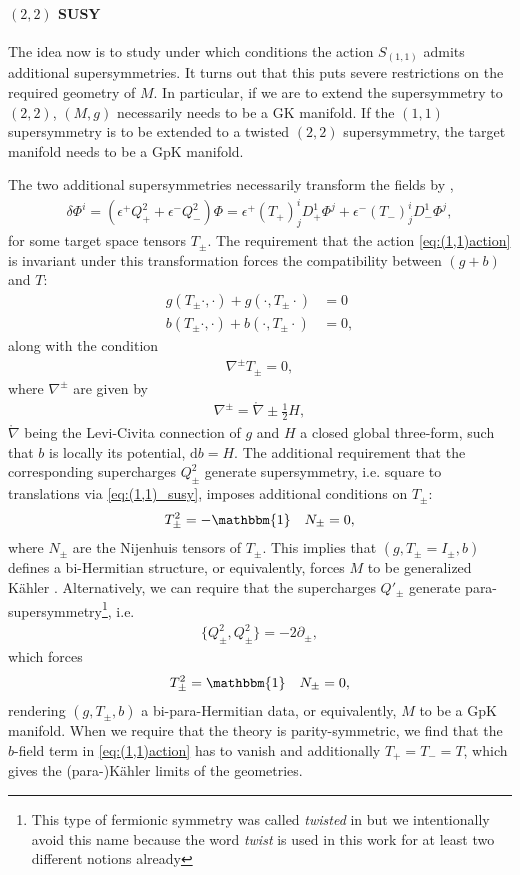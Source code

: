 \documentclass{article}
\newcommand{\id}{\mathbbm{1}}
\newcommand{\lc}{\mathring{\n}}
\newcommand{\p}{\partial}
\newcommand{\n}{\nabla}
\newcommand{\rd}{\mathrm{d}}
\theoremstyle{definition}
\theoremstyle{definition}
\theoremstyle{remark}
\begin{document}
\paragraph*{$(2,2)$ SUSY} The idea now is to study under which conditions the action $S_{(1,1)}$ admits additional supersymmetries. It turns out that this puts severe restrictions on the required geometry of $M$. In particular, if we are to extend the supersymmetry to $(2,2)$, $(M,g)$ necessarily needs to be a GK manifold. If the $(1,1)$ supersymmetry is to be extended to a twisted $(2,2)$ supersymmetry, the target manifold needs to be a GpK manifold.

The two additional supersymmetries necessarily transform the fields by \cite{HullTwistedSUSY},
\begin{align}\label{eq:extended_susy}
\delta\Phi^i=(\epsilon^+Q_+^2+\epsilon^-Q_-^2)\Phi=\epsilon^+ (T_+)^i_jD^1_+\Phi^j+\epsilon^- (T_-)^i_jD^1_-\Phi^j,
\end{align}
for some target space tensors $T_\pm$. The requirement that the action \eqref{eq:(1,1)action} is invariant under this transformation forces the compatibility between $(g+b)$ and $T$:
\begin{align*}
g(T_\pm\cdot,\cdot)+g(\cdot,T_\pm\cdot)&=0\\
b(T_\pm\cdot,\cdot)+b(\cdot,T_\pm\cdot)&=0,
\end{align*}
along with the condition
\begin{align*}
\n^\pm T_\pm=0,
\end{align*}
where $\n^\pm$ are given by
\begin{align*}
\n^\pm=\lc\pm \frac{1}{2}H,
\end{align*}
$\lc$ being the Levi-Civita connection of $g$ and $H$ a closed global three-form, such that $b$ is locally its potential, $\rd b=H$. The additional requirement that the corresponding supercharges $Q^2_\pm$ generate supersymmetry, i.e. square to translations via \eqref{eq:(1,1)_susy}, imposes additional conditions on $T_\pm$:
\begin{align*}
T_\pm^2=-\id\quad N_\pm=0,
\end{align*}
where $N_\pm$ are the Nijenhuis tensors of $T_\pm$.
This implies that $(g,T_\pm=I_\pm,b)$ defines a bi-Hermitian structure, or equivalently, forces $M$ to be generalized K\"ahler \cite{Gualtieri:2003dx}. Alternatively, we can require that the supercharges $Q'_\pm$ generate para-supersymmetry\footnote{This type of fermionic symmetry was called {\it twisted} in \cite{HullTwistedSUSY} but we intentionally avoid this name because the word {\it twist} is used in this work for at least two different notions already}, i.e.
\begin{align}\label{eq:(1,1)_parasusy}
\{Q^2_\pm,Q^2_\pm\}=-2\p_\pm,
\end{align}
which forces
\begin{align*}
T_\pm^2=\id\quad N_\pm=0,
\end{align*}
rendering $(g,T_\pm,b)$ a bi-para-Hermitian data, or equivalently, $M$ to be a GpK manifold. When we require that the theory is parity-symmetric, we find that the $b$-field term in \eqref{eq:(1,1)action} has to vanish and additionally $T_+=T_-=T$, which gives the (para-)K\"ahler limits of the geometries.
\end{document}
